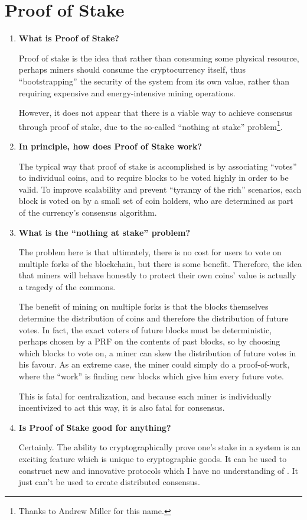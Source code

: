 \documentclass[letterpaper]{article}
\theoremstyle{xxx}
\theoremstyle{evil}
\theoremstyle{yyy}
\theoremstyle{plain}
\theoremstyle{zzz}
\begin{document}
\section{Proof of Stake}
\begin{enumerate}
\item \textbf{What is Proof of Stake?}

Proof of stake is the idea that rather than consuming some physical resource,
perhaps miners should consume the cryptocurrency itself, thus ``bootstrapping''
the security of the system from its own value, rather than requiring expensive
and energy-intensive mining operations.

However, it does not appear that there is a viable way to achieve consensus
through proof of stake, due to the so-called ``nothing at stake''
problem\footnote{Thanks to Andrew Miller for this name.}.

\item \textbf{In principle, how does Proof of Stake work?}

The typical way that proof of stake is accomplished is by associating ``votes''
to individual coins, and to require blocks to be voted highly in order to be
valid. To improve scalability and prevent ``tyranny of the rich'' scenarios, each
block is voted on by a small set of coin holders, who are determined as part
of the currency's consensus algorithm.

\item \textbf{What is the ``nothing at stake'' problem?}

The problem here is that ultimately, there is no cost for users to vote on multiple
forks of the blockchain, but there is some benefit. Therefore, the idea that miners
will behave honestly to protect their own coins' value is actually a tragedy of the
commons.

The benefit of mining on multiple forks is that the blocks themselves determine
the distribution of coins and therefore the distribution of future votes. In fact,
the exact voters of future blocks must be deterministic, perhaps chosen by a PRF
on the contents of past blocks, so by choosing which blocks to vote on, a miner
can skew the distribution of future votes in his favour. As an extreme case, the
miner could simply do a proof-of-work, where the ``work'' is finding new blocks
which give him every future vote.

This is fatal for centralization, and because each miner is individually
incentivized to act this way, it is also fatal for consensus.

\item \textbf{Is Proof of Stake good for anything?}

Certainly. The ability to cryptographically prove one's stake in a system is an
exciting feature which is unique to cryptographic goods. It can be used to construct
new and innovative protocols which I have no understanding of \smiley.
It just can't be used to create distributed consensus.

\end{enumerate}
\end{document}
